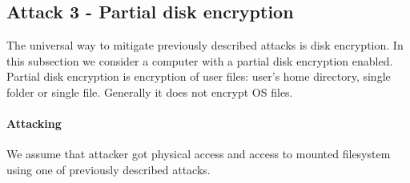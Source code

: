 \subsection{Attack 3 - Partial disk encryption}
The universal way to mitigate previously described attacks is disk encryption. In this subsection we consider a computer with a partial disk encryption enabled. Partial disk encryption is encryption of user files: user's home directory, single folder or single file. Generally it does not encrypt OS files.

\paragraph*{Attacking}
We assume that attacker got physical access and access to mounted filesystem using one of previously described attacks. 


